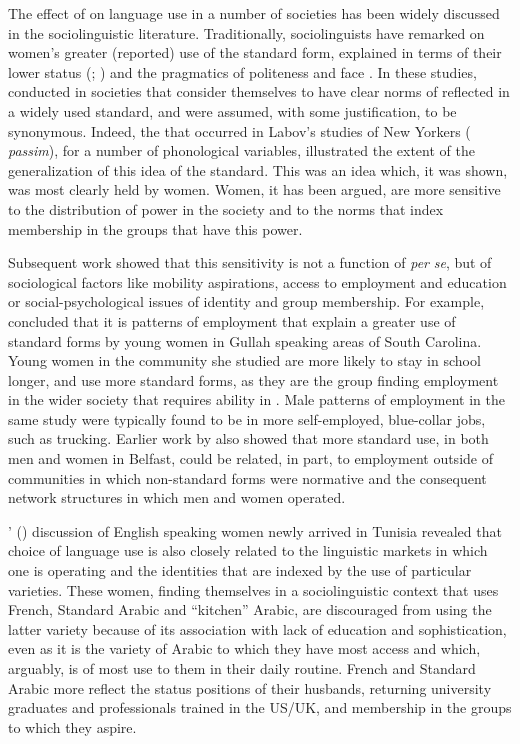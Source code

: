 The effect of  on language use in a number of societies has been widely discussed in the sociolinguistic literature.  Traditionally, sociolinguists have remarked on women’s greater (reported) use of the standard form, explained in terms of their lower status (\citealt[243]{Labov1972}; \citealt{Trudgill1972}) and the pragmatics of politeness and face \citep{Deuchar1988}.  In these studies, conducted in societies that consider themselves to have clear norms of  reflected in a widely used standard,  and  were assumed, with some justification, to be synonymous.  Indeed, the  that occurred in Labov’s studies of New Yorkers (\citeyear{Labov1972} \textit{passim}), for a number of phonological variables, illustrated the extent of the generalization of this idea of the standard.  This was an idea which, it was shown, was most clearly held by women.  Women, it has been argued, are more sensitive to the distribution of power in the society and to the norms that index membership in the groups that have this power.

Subsequent work showed that this sensitivity is not a function of  \textit{per} \textit{se}, but of sociological factors like mobility aspirations, access to employment and education or social-psychological issues of identity and group membership.  For example, \citet{Nichols1983} concluded that it is patterns of employment that explain a greater use of standard forms by young women in Gullah speaking areas of South Carolina.  Young women in the community she studied are more likely to stay in school longer, and use more standard forms, as they are the group finding employment in the wider society that requires ability in .  Male patterns of employment in the same study were typically found to be in more self-employed, blue-collar jobs, such as trucking.  Earlier work by \citet[184]{Milroy1980} also showed that more standard use, in both men and women in Belfast, could be related, in part, to employment outside of communities in which non-stan\-dard forms were normative and the consequent network structures in which men and women operated.  

  \citeauthor{Walters1996}' (\citeyear{Walters1996}) discussion of English speaking women newly arrived in Tunisia revealed that choice of language use is also closely related to the linguistic markets in which one is operating and the identities that are indexed by the use of particular varieties.  These women, finding themselves in a sociolinguistic context that uses French, Standard Arabic and “kitchen” Arabic, are discouraged from using the latter variety because of its association with lack of education and sophistication, even as it is the variety of Arabic to which they have most access and which, arguably, is of most use to them in their daily routine.  French and Standard Arabic more reflect the status positions of their husbands, returning university graduates and professionals trained in the US\slash UK, and membership in the groups to which they aspire.   

